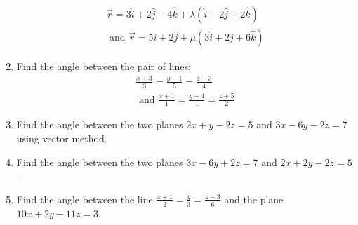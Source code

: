 \begin{enumerate}[label=\thesubsection.\arabic*, ref=\thesubsection.\theenumi]
\begin{align}
\overrightarrow{r}= 3 \hat{i}+ 2 \hat{j}- 4 \hat{k}+ \lambda(\hat{i}+ 2 \hat{j}+ 2 \hat{k}) \\
\text{ and } \overrightarrow{r}= 5 \hat{i}+ 2 \hat{j}+ \mu(3 \hat{i}+ 2 \hat{j}+ 6 \hat{k}) 
\end{align}
\item Find the angle between the pair of lines:
\begin{align}
\frac{x+3}{3}= \frac{y-1}{5}= \frac{z+3}{4}\\
\text{ and }\frac{x+1}{1}= \frac{y-4}{1}= \frac{z+5}{2}
\end{align}
\item Find the angle between the two planes $2x +y -2z =5$ and $3x- 6y- 2z= 7$ using vector method.
\item Find the angle between the two planes $3x -6y +2z =7$ and $2x +2y -2z =5$.
\item Find the angle between the line $\frac{x+1}{2} =\frac{y}{3} =\frac{z-3}{6}$ and the plane $10x +2y -11z =3$.
\end{enumerate}
